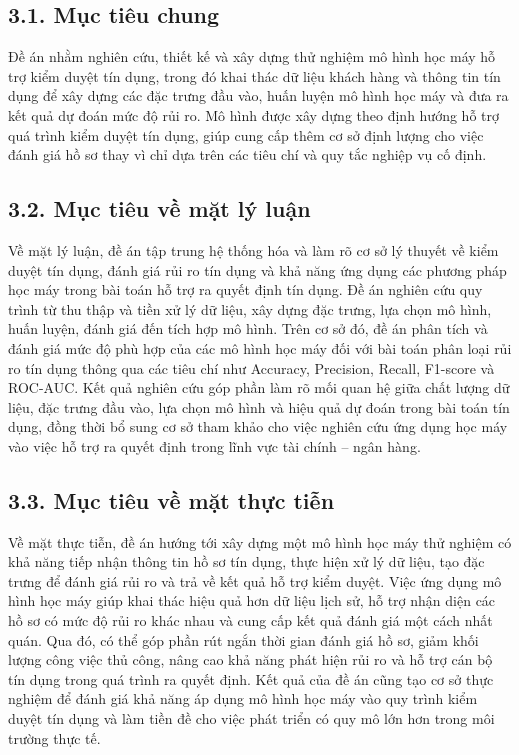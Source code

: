 \subsection*{3.1. Mục tiêu chung}

Đề án nhằm nghiên cứu, thiết kế và xây dựng thử nghiệm mô hình học máy hỗ trợ
kiểm duyệt tín dụng, trong đó khai thác dữ liệu khách hàng và thông tin tín dụng
để xây dựng các đặc trưng đầu vào, huấn luyện mô hình học máy và đưa ra kết quả
dự đoán mức độ rủi ro. Mô hình được xây dựng theo định hướng hỗ trợ quá trình
kiểm duyệt tín dụng, giúp cung cấp thêm cơ sở định lượng cho việc đánh giá hồ sơ
thay vì chỉ dựa trên các tiêu chí và quy tắc nghiệp vụ cố định.

\subsection*{3.2. Mục tiêu về mặt lý luận}

Về mặt lý luận, đề án tập trung hệ thống hóa và làm rõ cơ sở lý thuyết về kiểm
duyệt tín dụng, đánh giá rủi ro tín dụng và khả năng ứng dụng các phương pháp học
máy trong bài toán hỗ trợ ra quyết định tín dụng. Đề án nghiên cứu quy trình từ
thu thập và tiền xử lý dữ liệu, xây dựng đặc trưng, lựa chọn mô hình, huấn luyện,
đánh giá đến tích hợp mô hình. Trên cơ sở đó, đề án phân tích và
đánh giá mức độ phù hợp của các mô hình học máy đối với bài toán phân loại rủi ro
tín dụng thông qua các tiêu chí như Accuracy, Precision, Recall, F1-score và
ROC-AUC. Kết quả nghiên cứu góp phần làm rõ mối quan hệ giữa chất lượng dữ liệu,
đặc trưng đầu vào, lựa chọn mô hình và hiệu quả dự đoán trong bài toán tín dụng,
đồng thời bổ sung cơ sở tham khảo cho việc nghiên cứu ứng dụng học máy vào việc
hỗ trợ ra quyết định trong lĩnh vực tài chính -- ngân hàng.

\subsection*{3.3. Mục tiêu về mặt thực tiễn}

Về mặt thực tiễn, đề án hướng tới xây dựng một mô hình học máy thử nghiệm có khả
năng tiếp nhận thông tin hồ sơ tín dụng, thực hiện xử lý dữ liệu, tạo đặc trưng
để đánh giá rủi ro và trả về kết quả hỗ trợ kiểm duyệt. Việc ứng dụng mô hình học
máy giúp khai thác hiệu quả hơn dữ liệu lịch sử, hỗ trợ nhận diện các hồ sơ có
mức độ rủi ro khác nhau và cung cấp kết quả đánh giá một cách nhất quán. Qua đó,
có thể góp phần rút ngắn thời gian đánh giá hồ sơ, giảm khối lượng công việc thủ
công, nâng cao khả năng phát hiện rủi ro và hỗ trợ cán bộ tín dụng trong quá
trình ra quyết định. Kết quả của đề án cũng tạo cơ sở thực nghiệm để đánh giá khả
năng áp dụng mô hình học máy vào quy trình kiểm duyệt tín dụng và làm tiền đề cho
việc phát triển có quy mô lớn hơn trong môi trường thực tế.

